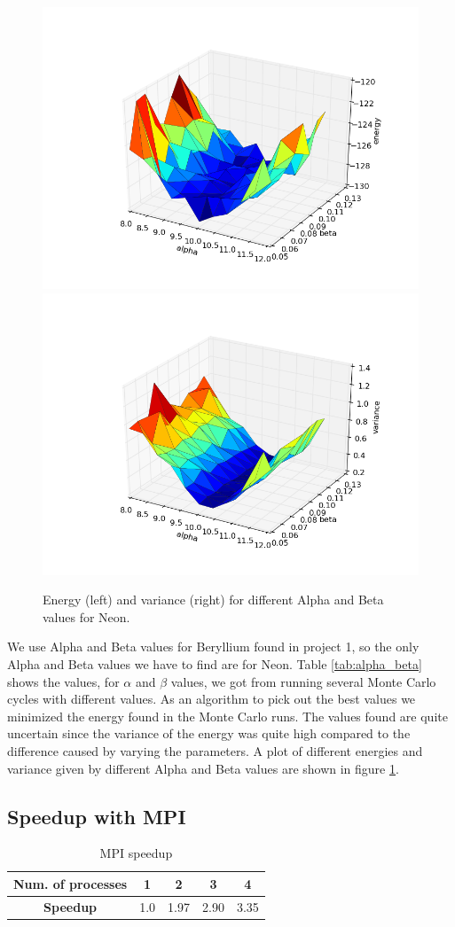 \documentclass[11pt]{article}
\begin{document}
		\begin{figure}
			\centering \includegraphics[width=0.45\linewidth]{figures/Neon_alpha_beta}
			\centering \includegraphics[width=0.45\linewidth]{figures/Neon_alpha_beta_var}
			\protect\caption{Energy (left) and variance (right) for different Alpha and Beta values for Neon.}
			\label{fig:alpha_beta_comparison}
		\end{figure}

		We use Alpha and Beta values for Beryllium found in project 1, so the only Alpha and Beta values we have to find are for Neon. Table \ref{tab:alpha_beta} shows the values, for \(\alpha\) and \(\beta\) values, we got from  running several Monte Carlo cycles with different values. As an algorithm to pick out the best values we minimized the energy found in the Monte Carlo runs. The values found are quite uncertain since the variance of the energy was quite high compared to the difference caused by varying the parameters. A plot of different energies and variance given by different Alpha and Beta values are shown in figure \ref{fig:alpha_beta_comparison}.

	\subsection{Speedup with MPI}
		\begin{table}
		\center
				\begin{tabular}{| c | c| c| c| c|}
				    \hline
				   	\textbf{Num. of processes} &	1	&	2	&	3	&	4
				    \\ \hline
				    \textbf{Speedup}	&	1.0	&	1.97	&	2.90	&	3.35
				    \\	\hline
			  \end{tabular}
			  \caption{MPI speedup}
			  \label{tab:MPI_speedup}
		\end{table}
\end{document}
